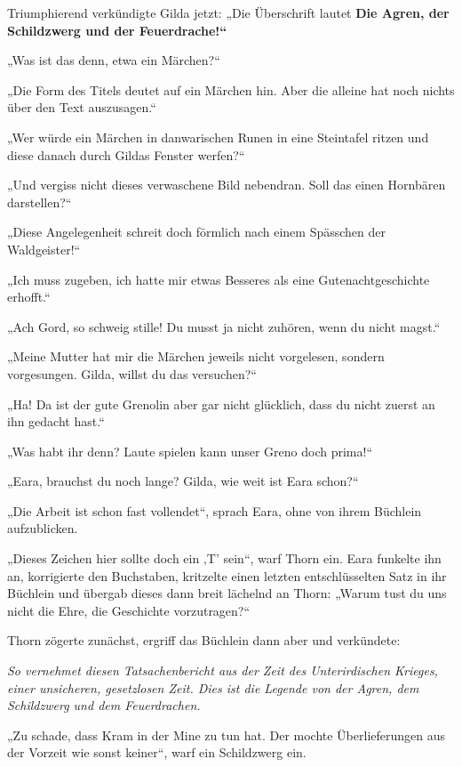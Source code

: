 \trennzeichen



Triumphierend verkündigte Gilda jetzt: „Die Überschrift lautet \textbf{Die Agren, der Schildzwerg und der Feuerdrache!“}

„Was ist das denn, etwa ein Märchen?“

„Die Form des Titels deutet auf ein Märchen hin. Aber die alleine hat noch nichts über den Text auszusagen.“

„Wer würde ein Märchen in danwarischen Runen in eine Steintafel ritzen und diese danach durch Gildas Fenster werfen?“

„Und vergiss nicht dieses verwaschene Bild nebendran. Soll das einen Hornbären darstellen?“

„Diese Angelegenheit schreit doch förmlich nach einem Spässchen der Waldgeister!“

„Ich muss zugeben, ich hatte mir etwas Besseres als eine Gutenachtgeschichte erhofft.“

„Ach Gord, so schweig stille! Du musst ja nicht zuhören, wenn du nicht magst.“

„Meine Mutter hat mir die Märchen jeweils nicht vorgelesen, sondern vorgesungen. Gilda, willst du das versuchen?“

„Ha! Da ist der gute Grenolin aber gar nicht glücklich, dass du nicht zuerst an ihn gedacht hast.“

„Was habt ihr denn? Laute spielen kann unser Greno doch prima!“

„Eara, brauchst du noch lange? Gilda, wie weit ist Eara schon?“

„Die Arbeit ist schon fast vollendet“, sprach Eara, ohne von ihrem Büchlein aufzublicken.

„Dieses Zeichen hier sollte doch ein ‚T’ sein“, warf Thorn ein. Eara funkelte ihn an, korrigierte den Buchstaben, kritzelte einen letzten entschlüsselten Satz in ihr Büchlein und übergab dieses dann breit lächelnd an Thorn: „Warum tust du uns nicht die Ehre, die Geschichte vorzutragen?“

Thorn zögerte zunächst, ergriff das Büchlein dann aber und verkündete:\bigskip



\textit{So vernehmet diesen Tatsachenbericht aus der Zeit des Unterirdischen Krieges, einer unsicheren, gesetzlosen Zeit. Dies ist die Legende von der Agren, dem Schildzwerg und dem Feuerdrachen.}\bigskip



„Zu schade, dass Kram in der Mine zu tun hat. Der mochte Überlieferungen aus der Vorzeit wie sonst keiner“, warf ein Schildzwerg ein.

